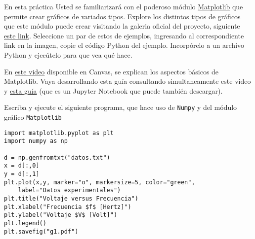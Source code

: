 \documentclass[11pt]{exam}
\begin{document}
\firstpageheadrule
\runningheadrule
{}
\cfoot{ }
\begin{flushleft}
\vspace{0.2in}

\vspace{0.25cm}
\end{flushleft}

\begin{questions}

\item En esta práctica Usted se familiarizará con el poderoso módulo \href{https://matplotlib.org/}{Matplotlib} que permite crear gráficos de variados tipos. Explore los distintos tipos de gráficos que este módulo puede crear visitando la galeria oficial del proyecto, siguiente \href{https://matplotlib.org/stable/gallery/index}{este link}. Seleccione un par de estos de ejemplos, ingresando al correspondiente link en la imagen, copie el código Python del ejemplo. Incorpórelo a un archivo Python y ejecútelo para que vea qué hace.

\item En \href{https://udec.instructure.com/courses/40179/pages/matplotlib?module_item_id=1576193}{este video} disponible en Canvas, se explican los aspectos básicos de Matplotlib. Vaya desarrollando esta guía consultando simultaneamente este video y \href{https://github.com/PythonUdeC/CPC21/blob/main/04-Matplotlib.ipynb}{esta guía} (que es un Jupyter Notebook que puede también descargar).

\item Escriba y ejecute el siguiente programa, que hace uso de \texttt{Numpy} y del módulo gráfico \texttt{Matplotlib}

\begin{verbatim}
import matplotlib.pyplot as plt
import numpy as np

d = np.genfromtxt("datos.txt")
x = d[:,0]
y = d[:,1]
plt.plot(x,y, marker="o", markersize=5, color="green", 
	label="Datos experimentales")
plt.title("Voltaje versus Frecuencia")
plt.xlabel("Frecuencia $f$ [Hertz]")
plt.ylabel("Voltaje $V$ [Volt]")
plt.legend()
plt.savefig("g1.pdf")
\end{verbatim}


\end{questions}
\end{document}
